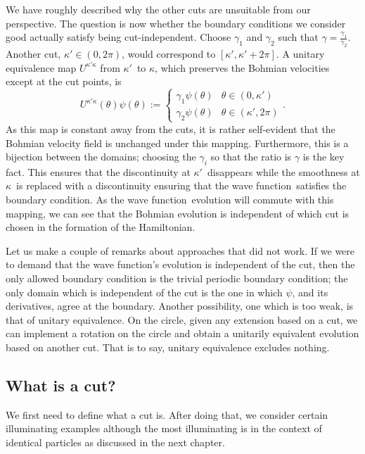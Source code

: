 \documentclass[11pt]{article}
\theoremstyle{remark}
\begin{document}
We have roughly described why the other cuts are unsuitable from our
perspective. The question is now whether the boundary conditions we
consider good actually satisfy being cut-independent. 
Choose $\gamma_1$ and $\gamma_2$ such that  $\gamma =
\frac{\gamma_1}{\gamma_2}$.  
Another cut, $\ensuremath{\kappa'} \in (0, 2\pi)$, would correspond to
$[\ensuremath{\kappa'}, \ensuremath{\kappa'}
+2\pi]$. A unitary equivalence map \ensuremath{U^{\ensuremath{\kappa}{'}  \ensuremath{\kappa}{}}} from \ensuremath{\kappa'}\ to \ensuremath{\kappa}, which
preserves the Bohmian velocities except at the cut points, is
\[
\ensuremath{U^{\ensuremath{\kappa}{'}  \ensuremath{\kappa}{}}}(\theta) \ensuremath{\psi}(\theta) \ensuremath{:=} \begin{cases}
                         \gamma_1 \ensuremath{\psi}(\theta) & \theta \in (0, \ensuremath{\kappa'})\\
                         \gamma_2 \ensuremath{\psi}(\theta) & \theta \in (\ensuremath{\kappa'}, 2\pi)
                        \end{cases}.
\]
As this map is constant away from the cuts, it is rather
self-evident that the Bohmian velocity field is unchanged under this mapping.
Furthermore, this is a bijection between the domains; choosing the
$\gamma_i$ so that  the ratio is $\gamma$ is the key fact. This
ensures that the 
discontinuity at \ensuremath{\kappa'}\ disappears while the smoothness at
\ensuremath{\kappa}\ is replaced with a discontinuity
 ensuring that the wave function\ satisfies the
boundary condition.
As the wave function\ evolution will commute with this mapping, we can see that
the Bohmian evolution is independent of which cut is chosen in the
formation of the Hamiltonian.


Let us make a couple of remarks about approaches that did not work. 
If we  were to demand that the wave function's  evolution
is independent of the cut, then the only allowed boundary condition is
 the trivial periodic
boundary condition;  the only domain which is
independent of the cut is the one in which \ensuremath{\psi}, and its derivatives,
agree at the boundary.
 Another possibility, one which is too weak, is
that of unitary equivalence. On the circle, given any extension based
on a cut, we can implement a rotation on the circle and obtain a
unitarily equivalent evolution based on another cut. That is to say,
unitary equivalence excludes nothing. 


\subsection{What is a cut?}
We first need to define what a cut is. After doing that, we 
consider certain illuminating examples although the most illuminating
is in the context of identical particles as discussed in the next chapter. 
\end{document}
